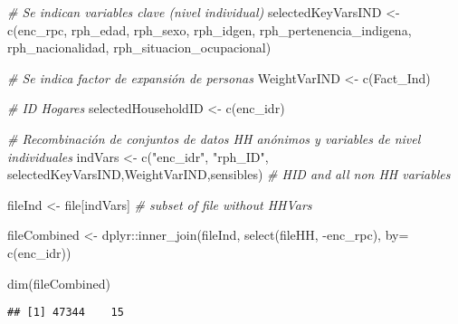\documentclass[
]{book}
\newenvironment{Shaded}{\begin{snugshade}}{\end{snugshade}}
\newcommand{\AttributeTok}[1]{\textcolor[rgb]{0.77,0.63,0.00}{#1}}
\newcommand{\CommentTok}[1]{\textcolor[rgb]{0.56,0.35,0.01}{\textit{#1}}}
\newcommand{\FunctionTok}[1]{\textcolor[rgb]{0.00,0.00,0.00}{#1}}
\newcommand{\NormalTok}[1]{#1}
\newcommand{\OtherTok}[1]{\textcolor[rgb]{0.56,0.35,0.01}{#1}}
\newcommand{\SpecialCharTok}[1]{\textcolor[rgb]{0.00,0.00,0.00}{#1}}
\newcommand{\StringTok}[1]{\textcolor[rgb]{0.31,0.60,0.02}{#1}}
\theoremstyle{definition}
\theoremstyle{definition}
\theoremstyle{definition}
\theoremstyle{definition}
\theoremstyle{remark}
\begin{document}
\begin{Shaded}
\begin{Highlighting}[]
\CommentTok{\# Se indican variables clave (nivel individual)}
\NormalTok{selectedKeyVarsIND }\OtherTok{\textless{}{-}} \FunctionTok{c}\NormalTok{(}\StringTok{\textquotesingle{}enc\_rpc\textquotesingle{}}\NormalTok{,}
                        \StringTok{\textquotesingle{}rph\_edad\textquotesingle{}}\NormalTok{,}
                        \StringTok{\textquotesingle{}rph\_sexo\textquotesingle{}}\NormalTok{,}
                        \StringTok{\textquotesingle{}rph\_idgen\textquotesingle{}}\NormalTok{,}
                        \StringTok{\textquotesingle{}rph\_pertenencia\_indigena\textquotesingle{}}\NormalTok{, }
                       \StringTok{\textquotesingle{}rph\_nacionalidad\textquotesingle{}}\NormalTok{,}
                       \StringTok{\textquotesingle{}rph\_situacion\_ocupacional\textquotesingle{}}\NormalTok{) }

\CommentTok{\# Se indica factor de expansión de personas}
\NormalTok{WeightVarIND }\OtherTok{\textless{}{-}} \FunctionTok{c}\NormalTok{(}\StringTok{\textquotesingle{}Fact\_Ind\textquotesingle{}}\NormalTok{)}

\CommentTok{\# ID Hogares}
\NormalTok{selectedHouseholdID }\OtherTok{\textless{}{-}} \FunctionTok{c}\NormalTok{(}\StringTok{\textquotesingle{}enc\_idr\textquotesingle{}}\NormalTok{)}

\CommentTok{\# Recombinación de conjuntos de datos HH anónimos y variables de nivel individuales}
\NormalTok{indVars }\OtherTok{\textless{}{-}} \FunctionTok{c}\NormalTok{(}\StringTok{"enc\_idr"}\NormalTok{, }\StringTok{"rph\_ID"}\NormalTok{, selectedKeyVarsIND,WeightVarIND,sensibles) }\CommentTok{\# HID and all non HH variables}

\NormalTok{fileInd }\OtherTok{\textless{}{-}}\NormalTok{ file[indVars] }\CommentTok{\# subset of file without HHVars}

\NormalTok{fileCombined }\OtherTok{\textless{}{-}}\NormalTok{ dplyr}\SpecialCharTok{::}\FunctionTok{inner\_join}\NormalTok{(fileInd, }\FunctionTok{select}\NormalTok{(fileHH, }\SpecialCharTok{{-}}\NormalTok{enc\_rpc), }\AttributeTok{by=} \FunctionTok{c}\NormalTok{(}\StringTok{\textquotesingle{}enc\_idr\textquotesingle{}}\NormalTok{))}

\FunctionTok{dim}\NormalTok{(fileCombined)}
\end{Highlighting}
\end{Shaded}

\begin{verbatim}
## [1] 47344    15
\end{verbatim}
\end{document}
